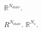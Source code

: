 \textsf{
$\mathbb{R}^{N_\mathrm{state}}$.
}

\textsf{
$R^{N_\mathrm{state}}$.
}
\textsf{
$\mathbb{R}^{N_s}$.
}

